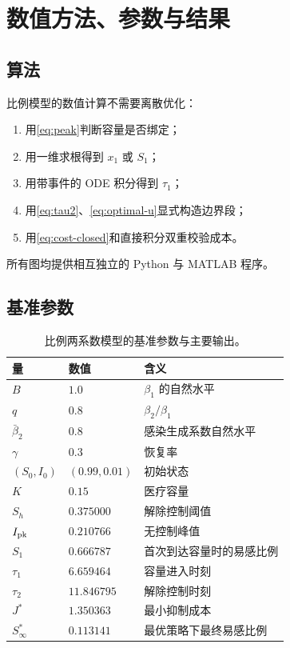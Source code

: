 \documentclass[11pt,a4paper,UTF8]{ctexart}
\theoremstyle{definition}
\begin{document}
\section{数值方法、参数与结果}

\subsection{算法}

比例模型的数值计算不需要离散优化：
\begin{enumerate}[label=\arabic*.,leftmargin=2.6em]
\item 用\eqref{eq:peak}判断容量是否绑定；
\item 用一维求根得到 $x_1$ 或 $S_1$；
\item 用带事件的 ODE 积分得到 $\tau_1$；
\item 用\eqref{eq:tau2}、\eqref{eq:optimal-u}显式构造边界段；
\item 用\eqref{eq:cost-closed}和直接积分双重校验成本。
\end{enumerate}
所有图均提供相互独立的 Python 与 MATLAB 程序。

\subsection{基准参数}

\begin{table}[H]
\centering
\caption{比例两系数模型的基准参数与主要输出。}
\label{tab:baseline-parameters}
\begin{tabular}{lll}
\toprule
量 & 数值 & 含义\\
\midrule
$B$ & $1.0$ & $\beta_1$ 的自然水平\\
$q$ & $0.8$ & $\beta_2/\beta_1$\\
$\bar\beta_2$ & $0.8$ & 感染生成系数自然水平\\
$\gamma$ & $0.3$ & 恢复率\\
$(S_0,I_0)$ & $(0.99,0.01)$ & 初始状态\\
$K$ & $0.15$ & 医疗容量\\
$S_h$ & $0.375000$ & 解除控制阈值\\
$I_{\rm pk}$ & $0.210766$ & 无控制峰值\\
$S_1$ & $0.666787$ & 首次到达容量时的易感比例\\
$\tau_1$ & $6.659464$ & 容量进入时刻\\
$\tau_2$ & $11.846795$ & 解除控制时刻\\
$J^*$ & $1.350363$ & 最小抑制成本\\
$S_\infty^*$ & $0.113141$ & 最优策略下最终易感比例\\
\bottomrule
\end{tabular}
\end{table}
\end{document}
